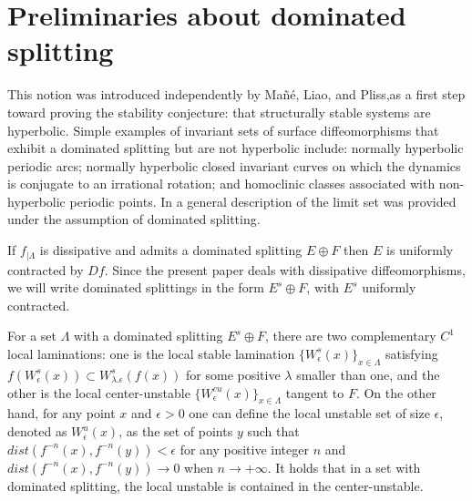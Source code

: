\documentclass[a4paper,11pt]{article}
\newtheorem{quest}{\bf Question}
\theoremstyle{definition}
\def\La{\Lambda}
\def\la{\lambda}
\def\e{\epsilon}
\def\eps{\epsilon}
\def\La{\Lambda}
\def\eps{\epsilon}
\begin{document}





\section{Preliminaries about dominated splitting}
\label{sec:preliminaries}
This notion was  introduced independently
by Ma\~n\'e, Liao, and Pliss,as a first step toward proving the stability conjecture: that structurally stable systems are hyperbolic. Simple examples of invariant sets of surface diffeomorphisms that exhibit a dominated splitting but are not hyperbolic include: normally hyperbolic periodic arcs; normally hyperbolic closed invariant curves on which the dynamics is conjugate to an irrational rotation; and homoclinic classes associated with non-hyperbolic periodic points. In \cite{PS2} a general description of the limit set was provided under the assumption of dominated splitting.


   
If $f_{|\Lambda}$ is dissipative and admits a dominated splitting $E \oplus F$ then $E$ is uniformly contracted by $Df$. Since the present paper deals with dissipative diffeomorphisms, we will write dominated splittings in the form $E^s \oplus F$, with $E^s$ uniformly contracted.

For a set $\La$ with a dominated splitting $E^s\oplus F$, there are two complementary $C^1$ local laminations: one is  the  local stable  lamination $\{W^{s}_\eps(x)\}_{x\in \La}$ satisfying $f(W^s_\e(x))\subset W^s_{\la.\e}(f(x))$ for some positive $\la$ smaller than one, and the other is the local center-unstable $\{W^{cu}_\eps(x)\}_{x\in \La}$ tangent to $F$. On the other hand, for any point $x$ and $\eps>0$ one can define   the local unstable set of size $\eps$, denoted as   $W^{u}_\eps(x)$, as the set of points $y$ such that $dist(f^{-n}(x), f^{-n}(y))<\eps$ for any positive integer $n$ and  $dist(f^{-n}(x), f^{-n}(y))\to 0$ when  $ n\to +\infty$.  It holds that in a set with dominated splitting, the local unstable is contained in the  center-unstable. 
\end{document}
